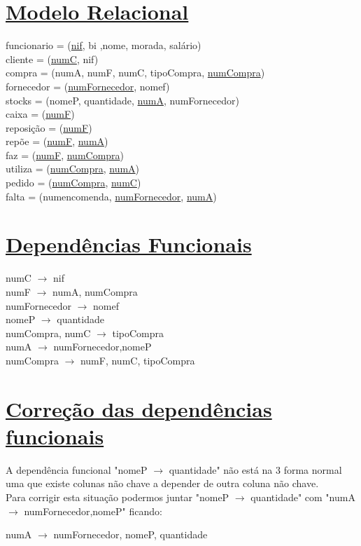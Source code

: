 \documentclass[12pt]{article}
\begin{document}
\begin{titlepage}
\section*{\underline{Modelo Relacional}}
funcionario = (\underline{nif}, bi ,nome, morada, salário)\\
cliente     = (\underline{numC}, nif)\\
compra      = (numA, numF, numC, tipoCompra, \underline{numCompra})\\
fornecedor  = (\underline{numFornecedor}, nomef)\\
stocks      = (nomeP, quantidade, \underline{numA}, numFornecedor)\\
caixa       = (\underline{numF})\\
reposição   = (\underline{numF})\\
repõe       = (\underline{numF}, \underline{numA})\\
faz         = (\underline{numF}, \underline{numCompra})\\
utiliza     = (\underline{numCompra}, \underline{numA})\\
pedido      = (\underline{numCompra}, \underline{numC})\\
falta       = (numencomenda, \underline{numFornecedor}, \underline{numA})
\section*{\underline{Dependências Funcionais}}
numC $\longrightarrow$ nif\\
numF $\longrightarrow$ numA, numCompra\\
numFornecedor $\longrightarrow$ nomef\\
nomeP $\longrightarrow$ quantidade\\
numCompra, numC $\longrightarrow$ tipoCompra\\ 
numA $\longrightarrow$ numFornecedor,nomeP\\
numCompra $\longrightarrow$ numF, numC, tipoCompra
\section*{\underline{Correção das dependências funcionais}}
	A dependência funcional "nomeP $\longrightarrow$ quantidade" não está na 3 forma normal uma que existe colunas não chave a depender de outra coluna não chave.\\
Para corrigir esta situação podermos juntar "nomeP $\longrightarrow$ quantidade" com "numA $\longrightarrow$ numFornecedor,nomeP" ficando:
\begin{center}
numA $\longrightarrow$ numFornecedor, nomeP, quantidade
\end{center}
\end{titlepage}
\end{document}
